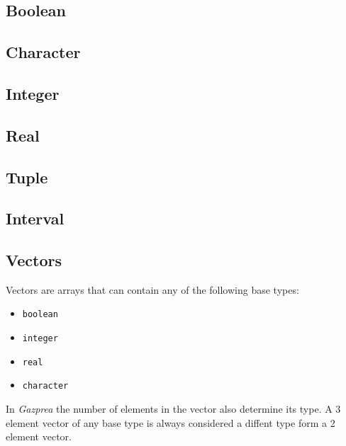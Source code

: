 \documentclass[../../gazprea.tex]{subfiles}
\begin{document}
\subsection{Boolean}
\label{ssec:boolean}


\subsection{Character}
\label{ssec:character}


\subsection{Integer}
\label{ssec:integer}


\subsection{Real}
\label{ssec:real}


\subsection{Tuple}
\label{ssec:tuple}


\subsection{Interval}
\label{ssec:interval}


	\subsection{Vectors}\label{sec:vector}

		Vectors are arrays that can contain any of the following base types:
		\begin{itemize}
			\item \texttt{boolean}
			\item \texttt{integer}
			\item \texttt{real}
			\item \texttt{character}
		\end{itemize}

		In \textit{Gazprea} the number of elements in the vector also determine its type. A 3 element vector of any base
		type is always considered a diffent type form a 2 element vector.
\end{document}
